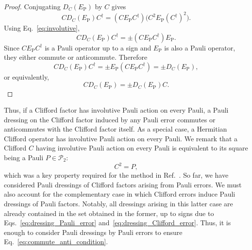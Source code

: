 \documentclass[
 reprint,
 amsmath,amssymb,
 pra,superscriptaddress, nofootinbib
]{revtex4-2}
\theoremstyle{definition}
\theoremstyle{plain}
\newcommand{\cP}{\mathcal P}
\begin{document}
\begin{proof}
Conjugating $D_C(E_\mathrm{P})$ by $C$ gives
\begin{equation}
  C D_C(E_\mathrm{P}) C^\dagger=(CE_\mathrm{P}C^\dagger)\bigl(C^2E_\mathrm{P}(C^\dagger)^2\bigr).
\end{equation}
Using Eq.~\eqref{eq:involutive}, 
\begin{equation}
  C D_C(E_\mathrm{P}) C^\dagger=\pm (CE_\mathrm{P}C^\dagger) E_\mathrm{P}.
\end{equation}
Since $CE_\mathrm{P}C^\dagger$ is a Pauli operator up to a sign and $E_\mathrm{P}$ is also a Pauli operator, they either commute or anticommute. Therefore
\begin{equation}
  C D_C(E_\mathrm{P}) C^\dagger=\pm E_\mathrm{P}(CE_\mathrm{P}C^\dagger)=\pm D_C(E_\mathrm{P}), 
  \label{eq:dressing_preserve}
\end{equation}
or equivalently, 
\begin{equation}
  C D_C(E_\mathrm{P})=\pm D_C(E_\mathrm{P})C.
\end{equation}
\end{proof}

Thus, if a Clifford factor has involutive Pauli action on every Pauli, a Pauli dressing on the Clifford factor induced by any Pauli error commutes or anticommutes with the Clifford factor itself. 
As a special case, a Hermitian Clifford operator has involutive Pauli action on every Pauli. We remark that a Clifford $C$ having involutive Pauli action on every Pauli is equivalent to its square being a Pauli $P\in\cP_2$:
\begin{equation}
  C^2=P,
  \label{eq:psc}
\end{equation}
which was a key property required for the method in Ref.~\cite{fby6-xjbm}.
So far, we have considered Pauli dressings of Clifford factors arising from Pauli errors. We must also account for the complementary case in which Clifford errors induce Pauli dressings of Pauli factors. Notably, all dressings arising in this latter case are already contained in the set obtained in the former, up to signs due to Eqs.~\eqref{eq:dressing_Pauli_error} and~\eqref{eq:dressing_Clifford_error}. 
Thus, it is enough to consider Pauli dressings by Pauli errors to ensure  Eq.~\eqref{eq:commute_anti_condition}.
\end{document}
